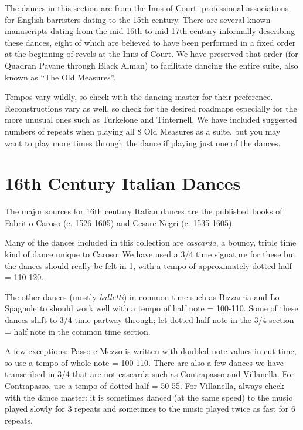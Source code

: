 \documentclass[11pt]{book}
\begin{document}
The dances in this section are from the Inns of Court: professional
associations for English barristers dating to the 15th century. There are
several known manuscripts dating from the mid-16th to mid-17th century
informally describing these dances, eight of which are believed to have been
performed in a fixed order at the beginning of revels at the Inns of Court. We
have preserved that order (for Quadran Pavane through Black Alman) to
facilitate dancing the entire suite, also known as ``The Old Measures''.

Tempos vary wildly, so check with the dancing master for their preference.
Reconstructions vary as well, so check for the desired roadmaps especially for
the more unusual ones such as Turkelone and Tinternell. We have included
suggested numbers of repeats when playing all 8 Old Measures as a suite, but
you may want to play more times through the dance if playing just one of the
dances.

\clearpage


\chapter{16th Century Italian Dances}

The major sources for 16th century Italian dances are the published books of
Fabritio Caroso (c. 1526-1605) and Cesare Negri (c. 1535-1605).

Many of the dances included in this collection are {\em cascarda}, a bouncy,
triple time kind of dance unique to Caroso. We have used a 3/4 time signature
for these but the dances should really be felt in 1, with a tempo of
approximately dotted half = 110-120.

The other dances (mostly {\em balletti}) in common time such as Bizzarria and
Lo Spagnoletto should work well with a tempo of half note = 100-110. Some of
these dances shift to 3/4 time partway through; let dotted half note in the 3/4
section = half note in the common time section. 

A few exceptions: Passo e Mezzo is written with doubled note values in cut
time, so use a tempo of whole note = 100-110. There are also a few dances we
have transcribed in 3/4 that are not cascarda such as Contrapasso and
Villanella. For Contrapasso, use a tempo of dotted half = 50-55. For
Villanella, always check with the dance master: it is sometimes danced (at the
same speed) to the music played slowly for 3 repeats and sometimes to the music
played twice as fast for 6 repeats. 
\end{document}
